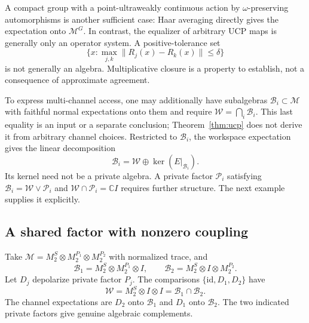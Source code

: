 \documentclass[11pt]{article}
\theoremstyle{definition}
\theoremstyle{remark}
\newcommand{\id}{\mathrm{id}}
\newcommand{\W}{\mathcal W}
\newcommand{\M}{\mathcal M}
\newcommand{\B}{\mathcal B}
\begin{document}
A compact group with a point-ultraweakly continuous action by $\omega$-preserving automorphisms is another sufficient case: Haar averaging directly gives the expectation onto $\M^G$. In contrast, the equalizer of arbitrary UCP maps is generally only an operator system. A positive-tolerance set
\begin{equation}
 \{x:\max_{j,k}\|R_j(x)-R_k(x)\|\le\delta\}
\end{equation}
is not generally an algebra. Multiplicative closure is a property to establish, not a consequence of approximate agreement.

To express multi-channel access, one may additionally have subalgebras $\B_i\subset\M$ with faithful normal expectations onto them and require $\W=\bigcap_i\B_i$. This last equality is an input or a separate conclusion; Theorem~\ref{thm:ucp} does not derive it from arbitrary channel choices. Restricted to $\B_i$, the workspace expectation gives the linear decomposition
\begin{equation}
 \B_i=\W\oplus\ker(E|_{\B_i}).
\end{equation}
Its kernel need not be a private algebra. A private factor $\mathcal P_i$ satisfying $\B_i=\W\vee\mathcal P_i$ and $\W\cap\mathcal P_i=\mathbb CI$ requires further structure. The next example supplies it explicitly.

\subsection{A shared factor with nonzero coupling}

Take $\M=M_2^{S}\otimes M_2^{P_1}\otimes M_2^{P_2}$ with normalized trace, and
\begin{equation}
 \B_1=M_2^S\otimes M_2^{P_1}\otimes I,\qquad
 \B_2=M_2^S\otimes I\otimes M_2^{P_2}.
\end{equation}
Let $D_j$ depolarize private factor $P_j$. The comparisons $\{\id,D_1,D_2\}$ have
\begin{equation}
 \W=M_2^S\otimes I\otimes I=\B_1\cap\B_2.
\end{equation}
The channel expectations are $D_2$ onto $\B_1$ and $D_1$ onto $\B_2$. The two indicated private factors give genuine algebraic complements.
\end{document}
